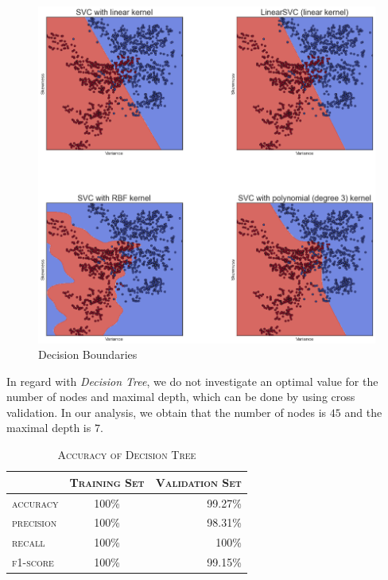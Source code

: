 \documentclass[a4paper,11pt]{amsart}
\begin{document}
\begin{figure}
 \includegraphics[width=\linewidth]{download.png}
  \caption{Decision Boundaries}
  \label{fig:svc1}
\end{figure}

\medbreak

In regard with \emph{Decision Tree}, we do not investigate an optimal value for the number of nodes and maximal depth, which can be done by using cross validation. In our analysis, we obtain that the number of nodes is $45$ and the maximal depth is $7$.
\begin{table}[h!]
  \begin{center}
    \caption{\textsc{Accuracy of Decision Tree}}
    \label{tab:table5}
    \begin{tabular}{l|c|r|} 
      & \textsc{Training Set}  & \textsc{Validation Set}\\
      \hline
      \textsc{accuracy}& 100\% & 99.27\%\\
      \textsc{precision}& 100\% & 98.31\%\\
      \textsc{recall} & 100\% & 100\%\\
      \textsc{f1-score} &100\% & 99.15\%\\
    \end{tabular}
  \end{center}
\end{table}
\end{document}
